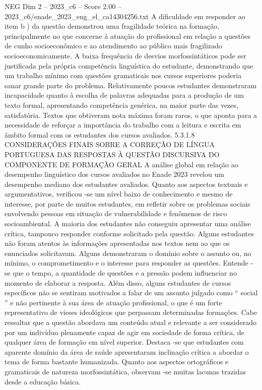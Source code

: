 \begin{textsample}{NEG Dim 2 – 2023\_c6 – Score 2.00 – 2023\_c6/enade\_2023\_eng\_el\_ca14304256.txt}
A dificuldade em responder ao item b ) da questão demonstrou uma fragilidade teórica na formação, principalmente no que concerne à atuação do profissional em relação a questões de cunho socioeconômico e ao atendimento ao público mais fragilizado socioeconomicamente.
A baixa frequência de desvios morfossintáticos pode ser justificada pela própria competência linguística do estudante, demonstrando que um trabalho mínimo com questões gramaticais nos cursos superiores poderia sanar grande parte do problema.
Relativamente poucos estudantes demonstraram incapacidade quanto à escolha de palavras adequadas para a produção de um texto formal, apresentando competência genérica, na maior parte das vezes, satisfatória.
Textos que obtiveram nota máxima foram raros, o que aponta para a necessidade de reforçar a importância do trabalho com a leitura e escrita em âmbito formal com os estudantes dos cursos avaliados. 5.3.1.8 CONSIDERAÇÕES FINAIS SOBRE A CORREÇÃO DE LÍNGUA PORTUGUESA DAS RESPOSTAS À QUESTÃO DISCURSIVA DO COMPONENTE DE FORMAÇÃO GERAL A análise global em relação ao desempenho linguístico dos cursos avaliados no Enade 2023 revelou um desempenho mediano dos estudantes avaliados.
Quanto aos aspectos textuais e argumentativos, verificou -se um nível baixo de conhecimento e mesmo de interesse, por parte de muitos estudantes, em refletir sobre os problemas sociais envolvendo pessoas em situação de vulnerabilidade e fenômenos de risco socioambiental.
A maioria dos estudantes não conseguiu apresentar uma análise crítica, tampouco responder conforme solicitado pela questão.
Alguns estudantes não foram atentos às informações apresentadas nos textos nem ao que os enunciados solicitavam.
Alguns demonstraram o domínio sobre o assunto ou, no mínimo, o comprometimento e o interesse para responder as questões.
Entende -se que o tempo, a quantidade de questões e a pressão podem influenciar no momento de elaborar a resposta.
Além disso, alguns estudantes de cursos específicos não se sentiram motivados a falar de um assunto julgado como “ social ” e não pertinente à sua área de atuação profissional, o que é um forte representativo de vieses ideológicos que perpassam determinadas formações.
Cabe ressaltar que a questão abordava um conteúdo atual e relevante a ser considerado por um indivíduo plenamente capaz de agir em sociedade de forma crítica, de qualquer área de formação em nível superior.
Destaca -se que estudantes com aparente domínio da área de saúde apresentaram inclinação crítica a abordar o tema de forma bastante humanizada.
Quanto aos aspectos ortográficos e gramaticais de natureza morfossintática, observam -se muitas lacunas trazidas desde a educação básica.

\end{textsample}
